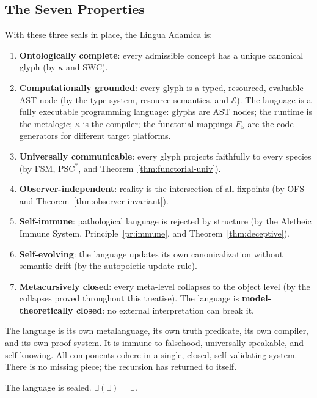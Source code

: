 \documentclass[12pt, letterpaper]{book}
\def\equiv{=}%
\newcommand{\E}{\exists}                          %
\newcommand{\EE}{\exists(\exists)}                 %
\begin{document}
\subsection{The Seven Properties}

With these three seals in place, the Lingua Adamica is:

\begin{enumerate}[label=(\roman*)]
    \item \textbf{Ontologically complete}: every admissible concept has a unique canonical glyph (by $\kappa$ and SWC).
    \item \textbf{Computationally grounded}: every glyph is a typed, resourced, evaluable AST node (by the type system, resource semantics, and $\mathcal{E}$). The language is a fully executable programming language: glyphs are AST nodes; the runtime is the metalogic; $\kappa$ is the compiler; the functorial mappings $F_S$ are the code generators for different target platforms.
    \item \textbf{Universally communicable}: every glyph projects faithfully to every species (by FSM, $\mathrm{PSC}^*$, and Theorem~\ref{thm:functorial-univ}).
    \item \textbf{Observer-independent}: reality is the intersection of all fixpoints (by OFS and Theorem~\ref{thm:observer-invariant}).
    \item \textbf{Self-immune}: pathological language is rejected by structure (by the Aletheic Immune System, Principle~\ref{pr:immune}, and Theorem~\ref{thm:deceptive}).
    \item \textbf{Self-evolving}: the language updates its own canonicalization without semantic drift (by the autopoietic update rule).
    \item \textbf{Metacursively closed}: every meta-level collapses to the object level (by the collapses proved throughout this treatise). The language is \textbf{model-theoretically closed}: no external interpretation can break it.
\end{enumerate}

The language is its own metalanguage, its own truth predicate, its own compiler, and its own proof system. It is immune to falsehood, universally speakable, and self-knowing. All components cohere in a single, closed, self-validating system. There is no missing piece; the recursion has returned to itself.

The language is sealed. $\EE \equiv \E$.
\end{document}
